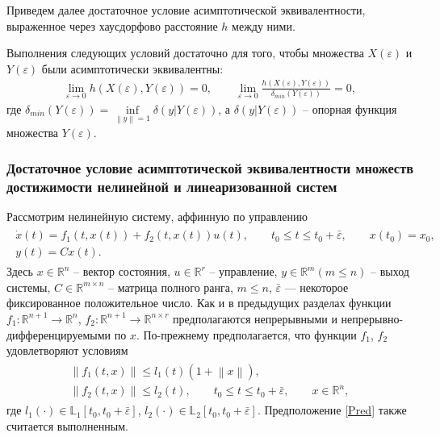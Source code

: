 \documentclass[../main.tex]{subfiles}
\begin{document}
Приведем далее достаточное условие асимптотической эквивалентности, выраженное через хаусдорфово расстояние $ h $ между ними.
\begin{theorem}\label{suff}\cite{GusevUMJ}
	 Выполнения следующих условий достаточно для того, чтобы множества $ X(\varepsilon) $ и $ Y(\varepsilon) $ были асимптотически эквивалентны:
	\begin{gather*}
		\lim\limits_{\varepsilon \rightarrow 0}h(X(\varepsilon),Y(\varepsilon)) = 0, \qquad	\lim\limits_{\varepsilon \rightarrow 0}\frac{h(X(\varepsilon),Y(\varepsilon))}{\delta_{min}(Y(\varepsilon))} = 0,
	\end{gather*}
	где $ \delta_{min}(Y(\varepsilon)) = \inf\limits_{\left\|y \right\| =1 } \delta(y|Y(\varepsilon))$, а $ \delta(y|Y(\varepsilon)) $ -- опорная функция множества $ Y(\varepsilon) $.
\end{theorem}
\subsubsection{Достаточное условие асимптотической эквивалентности множеств достижимости нелинейной и линеаризованной систем}
	Рассмотрим нелинейную систему, аффинную по управлению
\begin{gather}\label{nonlinearY}
	\begin{gathered}
		\dot{x}(t)=f_1(t,x(t))+f_2(t,x(t))u(t), \qquad t_0 \leq t \leq t_0 + \bar{\varepsilon}, \qquad x(t_0) = x_0, \\
		y(t) = C x(t).
	\end{gathered}
\end{gather}
Здесь $ x \in \mathbb{R}^n $ -- вектор состояния, $ u \in \mathbb{R}^r $ -- управление,  $ y\in\mathbb{R}^m (m \leqslant n) $ -- выход системы,
$ C\in \mathbb{R}^{m \times n} $  -- матрица полного ранга, $m\leq n$, $ \bar{\varepsilon} $ --- некоторое фиксированное положительное число.
	Как и в предыдущих разделах функции $ f_1: \mathbb{R}^{n+1} \rightarrow \mathbb{R}^{n} $, $ f_2: \mathbb{R}^{n+1} \rightarrow \mathbb{R}^{n \times r} $ предполагаются непрерывными и непрерывно-дифференцируемыми по $ x $.
По-прежнему предполагается, что функции $ f_1 $, $ f_2 $ удовлетворяют условиям
\begin{gather*}
	\begin{gathered}
		\left\| f_1(t,x) \right\| \leqslant	l_1(t)(1 + \left\| x \right\| ), \\
		\left\| f_2(t,x) \right\| \leqslant	l_2(t),  \qquad t_0 \leqslant t \leqslant t_0 + \bar{\varepsilon}, \qquad   x \in \mathbb{R}^n,
	\end{gathered}
\end{gather*}
где $ l_1(\cdot) \in \mathbb{L}_1[t_0,t_0+\bar{\varepsilon}] $, $ l_2(\cdot) \in \mathbb{L}_2[t_0,t_0+\bar{\varepsilon}] $. Предположение \ref{Pred} также считается выполненным.
\end{document}
